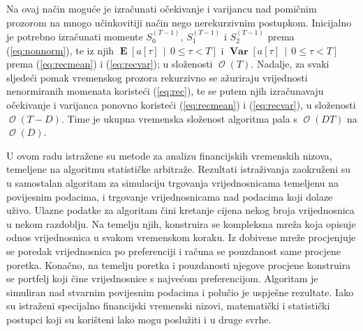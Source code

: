 \documentclass[lmodern, utf8, diplomski, numeric]{fer}
\newcommand{\Efromto}[2]{\operatorname{\mathbf{E}}\q[#1\, \middle\vert\, #2\w]}
\newcommand{\Varfromto}[2]{\operatorname{\mathbf{Var}}\q[#1\, \middle\vert\, #2\w]}
\newcommand{\bigO}[1]{\operatorname{\mathcal{O}}\q(#1\w)}
\newcommand{\q}{\left}
\newcommand{\w}{\right}
\begin{document}
  Na ovaj način moguće je izračunati očekivanje i varijancu nad pomičnim prozorom na mnogo učinkovitiji način nego nerekurzivnim postupkom.
  Inicijalno je potrebno izračunati momente $S_0^{(T - 1)}$, $S_1^{(T - 1)} $ i $S_2^{(T - 1)}$ prema (\ref{eq:nonnorm}), te iz njih $\Efromto{a\q[\tau\w]}{0 \le \tau < T}$ i $\Varfromto{a\q[\tau\w]}{0 \le \tau < T}$ prema (\ref{eq:recmean}) i (\ref{eq:recvar}); u složenosti $\bigO{T}$.
  Nadalje, za svaki sljedeći pomak vremenskog prozora rekurzivno se ažuriraju vrijednosti nenormiranih momenata koristeći (\ref{eq:rec}), te se putem njih izračunavaju očekivanje i varijanca ponovno koristeći (\ref{eq:recmean}) i (\ref{eq:recvar}), u složenosti $\bigO{T - D}$.
  Time je ukupna vremenska složenost algoritma pala s $\bigO{DT}$ na $\bigO{D}$.

  \begin{sazetak}
  U ovom radu istražene su metode za analizu financijskih vremenskih nizova, temeljene na algoritmu statističke arbitraže.
  Rezultati istraživanja zaokruženi su u samostalan algoritam za simulaciju trgovanja vrijednosnicama temeljenu na povijesnim podacima, i trgovanje vrijednosnicama nad podacima koji dolaze uživo.
  Ulazne podatke za algoritam čini kretanje cijena nekog broja vrijednosnica u nekom razdoblju.
  Na temelju njih, konstruira se kompleksna mreža koja opisuje odnos vrijednosnica u svakom vremenskom koraku.
  Iz dobivene mreže procjenjuje se poredak vrijednosnica po preferenciji i računa se pouzdanost same procjene poretka.
  Konačno, na temelju poretka i pouzdanosti njegove procjene konstruira se portfelj koji čine vrijednosnice s najvećom preferencijom.
  Algoritam je simuliran nad stvarnim povijesnim podacima i polučio je uspješne rezultate.
  Iako su istraženi specijalno financijski vremenski nizovi, matematički i statistički postupci koji su korišteni lako mogu poslužiti i u druge svrhe.

  \end{sazetak}
  \pagebreak
\end{document}
